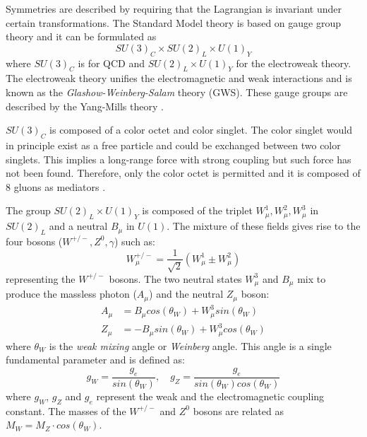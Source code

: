 Symmetries are described by requiring that the Lagrangian is invariant under certain transformations. The Standard Model theory is based on gauge group theory and it can be formulated as
\begin{equation}
  SU(3)_{C} \times SU(2)_{L} \times U(1)_{Y}
\end{equation}
where $SU(3)_{C}$ is for QCD and $SU(2)_{L} \times U(1)_{Y}$ for the electroweak theory. The electroweak theory unifies the electromagnetic and weak interactions and is known as the \textit{Glashow-Weinberg-Salam} theory (GWS). These gauge groups are described by the Yang-Mills theory \cite{Yang:1954ek}.

$SU(3)_{C}$ is composed of a color octet and color singlet. The color singlet would in principle exist as a free particle and could be exchanged between two color singlets. This implies a long-range force with strong coupling but such force has not been found. Therefore, only the color octet is permitted and it is composed of 8 gluons as mediators \cite{Griffiths:343277}.

The group $SU(2)_{L} \times U(1)_{Y}$ is composed of the triplet $W_{\mu}^1, W_{\mu}^2, W_{\mu}^3$ in $SU(2)_{L}$ and a neutral $B_{\mu}$ in $U(1)$. The mixture of these fields gives rise to the four bosons ($W^{+/-}, Z^0, \gamma$) such as:
\begin{equation}
  W_{\mu}^{+/-} = \frac{1}{\sqrt{2}}(W_{\mu}^1 \pm W_{\mu}^2)
\end{equation}
representing the $W^{+/-}$ bosons. The two neutral states $W_{\mu}^3$ and $B_{\mu}$ mix to produce the massless photon ($A_{\mu}$) and the neutral $Z_{\mu}$ boson:
\begin{equation}
  \begin{aligned}
    A_{\mu} &= B_{\mu} cos(\theta_W) + W_{\mu}^3 sin(\theta_W)\\
    Z_{\mu} &= - B_{\mu} sin(\theta_W) + W_{\mu}^3 cos(\theta_W)
  \end{aligned}
\end{equation}
where $\theta_W$ is the \textit{weak mixing} angle or \textit{Weinberg} angle. This angle is a single fundamental parameter and is defined as:
\begin{equation}
  g_W = \frac{g_e}{sin(\theta_W)}, \quad g_Z = \frac{g_e}{sin(\theta_W) cos(\theta_W)}
\end{equation}
where $g_W$, $g_Z$ and $g_e$ represent the weak and the electromagnetic coupling constant. The masses of the $W^{+/-}$ and $Z^0$ bosons are related as $M_W = M_Z \cdot cos(\theta_W)$.

